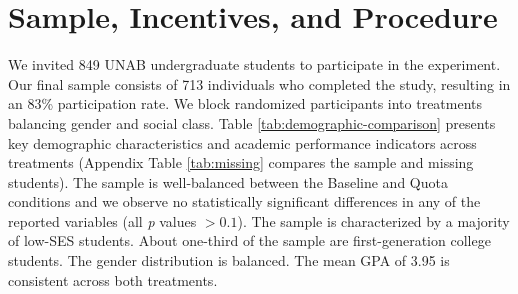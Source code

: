 \documentclass[11pt,a4paper,oneside]{article}
\begin{document}
\section{Sample, Incentives, and Procedure} \label{s4}
We invited 849 UNAB undergraduate students to participate in the experiment. Our final sample consists of 713 individuals who completed the study, resulting in an 83\% participation rate. We block randomized participants into treatments balancing gender and social class. Table \ref{tab:demographic-comparison} presents key demographic characteristics and academic performance indicators across treatments (Appendix Table \ref{tab:missing} compares the sample and missing students). The sample is well-balanced between the Baseline and Quota conditions and we observe no statistically significant differences in any of the reported variables (all \textit{p} values $> 0.1$). The sample is characterized by a majority of low-SES students. About one-third of the sample are first-generation college students. The gender distribution is balanced. The mean GPA of 3.95 is consistent across both treatments.
\end{document}
